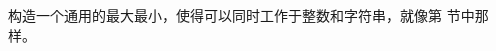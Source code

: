 \begin{Exercise}[title={接口和最大最小},difficulty=1]
\Question
构造一个通用的最大最小，使得可以同时工作于整数和字符串，就像第  节中那样。
\end{Exercise}

\begin{Answer}
\Question
\end{Answer}
